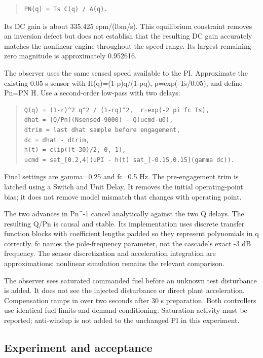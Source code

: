 \begin{quote}\footnotesize
\begin{verbatim}
PN(q) = Ts C(q) / A(q).
\end{verbatim}
\end{quote}
Its DC gain is about 335.425 rpm/(lbm/s). This equilibrium constraint removes an
inversion defect but does not establish that the resulting DC gain accurately
matches the nonlinear engine throughout the speed range. Its largest remaining
zero magnitude is approximately 0.952616.

The observer uses the same sensed speed available to the PI. Approximate the
existing 0.05 s sensor with H(q)=(1-p)q/(1-pq), p=exp(-Ts/0.05), and define
Pn=PN H. Use a second-order low-pass with two delays:

\begin{quote}\footnotesize
\begin{verbatim}
Q(q) = (1-r)^2 q^2 / (1-rq)^2,  r=exp(-2 pi fc Ts),
dhat = [Q/Pn](Nsensed-9000) - Q(ucmd-u0),
dtrim = last dhat sample before engagement,
dc = dhat - dtrim,
h(t) = clip((t-30)/2, 0, 1),
ucmd = sat_[0.2,4](uPI - h(t) sat_[-0.15,0.15](gamma dc)).
\end{verbatim}
\end{quote}
Final settings are gamma=0.25 and fc=0.5 Hz. The pre-engagement trim is latched
using a Switch and Unit Delay. It removes the initial operating-point bias;
it does not remove model mismatch that changes with operating point.

The two advances in Pn\textasciicircum{}-1 cancel analytically against the two Q delays. The
resulting Q/Pn is causal and stable. Its implementation uses discrete transfer
function blocks with coefficient lengths padded so they represent polynomials
in q correctly. fc names the pole-frequency parameter, not the cascade's exact
-3 dB frequency. The sensor discretization and acceleration integration are
approximations; nonlinear simulation remains the relevant comparison.

The observer sees saturated commanded fuel before an unknown test disturbance
is added. It does not see the injected disturbance or direct plant acceleration.
Compensation ramps in over two seconds after 30 s preparation. Both controllers use identical
fuel limits and demand conditioning. Saturation activity must be reported;
anti-windup is not added to the unchanged PI in this experiment.

\subsection{Experiment and acceptance}


